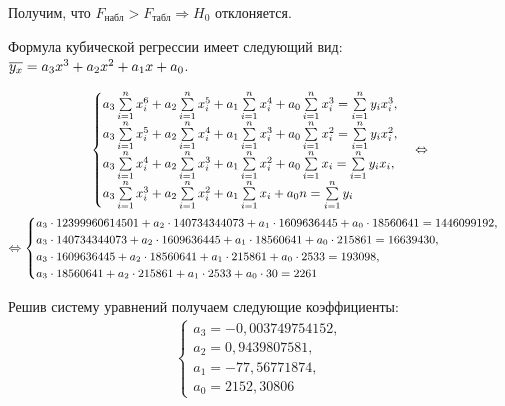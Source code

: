 \documentclass[utf8, a4paper, 14pt, russian, oneside]{book}
\begin{document}
Получим, что $F_{\text{набл}} > F_{\text{табл}} \Rightarrow H_0$ отклоняется. 

\newpage

Формула кубической регрессии имеет следующий вид: $\overline{ y_x } = a_3x^3 + a_2x^2 + a_1x + a_0$.

\begin{gather*}
    \begin{cases}
        a_3\sum\limits_{i=1}^n x_i^6 + a_2 \sum\limits_{i=1}^n x_i^5 + a_1 \sum\limits_{i=1}^n x_i^4 + a_0 \sum\limits_{i=1}^n x_i^3 = \sum\limits_{i=1}^n y_ix_i^3, \\
        a_3\sum\limits_{i=1}^n x_i^5 + a_2 \sum\limits_{i=1}^n x_i^4 + a_1 \sum\limits_{i=1}^n x_i^3 + a_0 \sum\limits_{i=1}^n x_i^2 = \sum\limits_{i=1}^n y_ix_i^2, \\
        a_3\sum\limits_{i=1}^n x_i^4 + a_2 \sum\limits_{i=1}^n x_i^3 + a_1 \sum\limits_{i=1}^n x_i^2 + a_0 \sum\limits_{i=1}^n x_i   = \sum\limits_{i=1}^n y_ix_i, \\
        a_3\sum\limits_{i=1}^n x_i^3 + a_2 \sum\limits_{i=1}^n x_i^2 + a_1 \sum\limits_{i=1}^n x_i   + a_0 n     = \sum\limits_{i=1}^n y_i
    \end{cases}
    \Leftrightarrow \\ 
    \Leftrightarrow
    \small
    \begin{cases}
        a_3 \cdot 12399960614501 + a_2 \cdot 140734344073 + a_1 \cdot 1609636445 + a_0 \cdot 18560641 = 1446099192, \\
        a_3 \cdot 140734344073   + a_2 \cdot 1609636445   + a_1 \cdot 18560641   + a_0 \cdot 215861   = 16639430, \\
        a_3 \cdot 1609636445     + a_2 \cdot 18560641     + a_1 \cdot 215861     + a_0 \cdot 2533     = 193098, \\
        a_3 \cdot 18560641       + a_2 \cdot 215861       + a_1 \cdot 2533       + a_0 \cdot 30       = 2261
    \end{cases}
\end{gather*}

Решив систему уравнений получаем следующие коэффициенты:
\begin{align*}
    \begin{cases}
        a_3 = -0,003749754152, \\
        a_2 = 0,9439807581, \\
        a_1 = -77,56771874, \\
        a_0 = 2152,30806
    \end{cases}
\end{align*}
\end{document}
